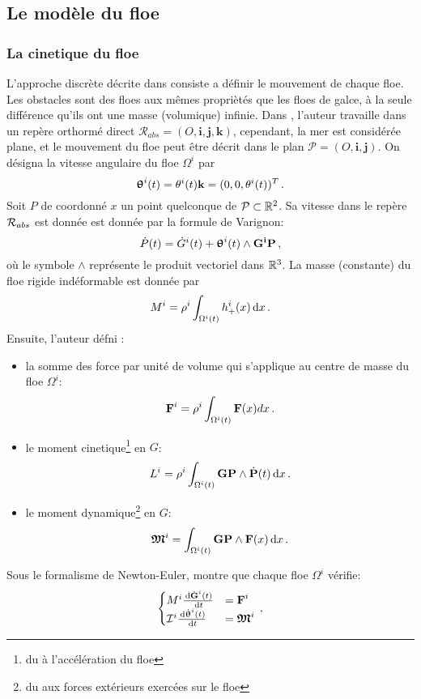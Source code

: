 \subsection{Le modèle du floe}

\subsubsection{La cinetique du floe}

L'approche discrète décrite dans \parencite{rabatel2015thesis} consiste a définir le mouvement de chaque floe. Les obstacles sont des floes aux mêmes propriètés que les floes de galce, à la seule différence qu'ils ont une masse (volumique) infinie. Dans \parencite{rabatel2015thesis}, l'auteur travaille dans un repère orthormé direct $\mathcal{R}_{abs} = (O, \bm i, \bm j, \bm k)$, cependant, la mer est considérée plane, et le mouvement du floe peut être décrit dans le plan $\mathcal{P} = (O, \bm i, \bm j)$. On désigna la vitesse angulaire du floe $\Omega^i$ par 
$$
\bm{\mathrm{\uptheta}}^i(t) = \theta^i(t)\bm{\mathrm{k}} = (0,0,\theta^i(t))^T \,.
$$
Soit $P$ de coordonné $x$ un point quelconque de $\mathcal{P} \subset \mathbb{R}^2$. Sa vitesse dans le repère $\mathcal{R}_{abs}$ est donnée est donnée par la formule de Varignon:
$$
\dot{P}(t) = \dot{G}^i(t) + \bm{\uptheta}^i(t) \wedge \bm{\mathrm{G^iP}} \,,
$$
où le symbole $\wedge$ représente le produit vectoriel dans $\mathbb{R}^3$. La masse (constante) du floe rigide indéformable est donnée par 
$$
M^i = \rho^i \int_{\Omega^i(t)} \hplus^i (x) \diff x \,.
$$
Ensuite, l'auteur défni :
\begin{itemize}
    \item la somme des force par unité de volume qui s'applique au centre de masse du floe $\Omega^i$: $$\bm{\mathrm{F}}^i = \rho^i \int_{\Omega^i(t)} \bm{\mathrm{F}}(x) dx \,.$$
    \item le moment cinetique\footnote{du à l'accélération du floe} en $G$: $$L^i = \rho^i \intO{i} \bvec{GP} \wedge \dot{\bvec{P}}(t) \diff x \,.$$
    \item le moment dynamique\footnote{du aux forces extérieurs exercées sur le floe} en $G$: $$\bvec{\mathfrak{M}}^i = \intO{i} \bvec{GP} \wedge \bvec{F}(x) \diff x \,.$$
\end{itemize}
Sous le formalisme de Newton-Euler, \citeauthor{rabatel2015thesis} montre que chaque floe $\Omega^i$ vérifie:
$$
    \begin{cases}
        M^i \frac{\diff \dot{\bvec{G}}^i(t)}{\diff t} &= \bvec{F}^i \\
        \mathcal{I}^i \frac{\diff \dot{\bvec{\uptheta}}^i(t)}{\diff t} &= \bvec{\mathfrak{M}}^i
    \end{cases} \,,
$$
